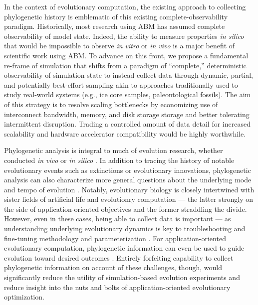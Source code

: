 In the context of evolutionary computation, the existing approach to collecting phylogenetic history is emblematic of this existing complete-observability paradigm.
Historically, most research using ABM has assumed complete observability of model state.
Indeed, the ability to measure properties \textit{in silico} that would be impossible to observe \textit{in vitro} or \textit{in vivo} is a major benefit of scientific work using ABM.
To advance on this front, we propose a fundamental re-frame of simulation that shifts from a paradigm of ``complete,'' deterministic observability of simulation state to instead collect data through dynamic, partial, and potentially best-effort sampling akin to approaches traditionally used to study real-world systems (e.g., ice core samples, paleontological fossils).
The aim of this strategy is to resolve scaling bottlenecks by economizing use of interconnect bandwidth, memory, and disk storage storage and better tolerating intermittent disruption.
Trading a controlled amount of data detail for increased scalability and hardware accelerator compatibility would be highly worthwhile.

Phylogenetic analysis is integral to much of evolution research, whether conducted \textit{in vivo} or \textit{in silico} \citep{faithConservationEvaluationPhylogenetic1992, STAMATAKIS2005phylogenetics,frenchHostPhylogenyShapes2023,kim2006discovery,lewinsohnStatedependentEvolutionaryModels2023a,lenski2003evolutionary}.
In addition to tracing the history of notable evolutionary events such as extinctions or evolutionary innovations, phylogenetic analysis can also characterize more general questions about the underlying mode and tempo of evolution \citep{moreno2023toward,hernandez2022can,shahbandegan2022untangling,lewinsohnStatedependentEvolutionaryModels2023a}.
Notably, evolutionary biology is closely intertwined with sister fields of artificial life and evolutionry computation --- the latter strongly on the side of application-oriented objectives and the former straddling the divide.
However, even in these cases, being able to collect data is important --- as understanding underlying evolutionary dynamics is key to troubleshooting and fine-tuning methodology and parameterization \citep{TODO}.
For application-oriented evolutionary computation, phylogenetic information can even be used to guide evolution toward desired outcomes \citep{lalejini2024phylogeny,lalejini2024runtime,murphy2008simple,burke2003increased}.
Entirely forfeiting capability to collect phylogenetic information on account of these challenges, though, would significantly reduce the utility of simulation-based evolution experiments and reduce insight into the nuts and bolts of application-oriented evolutionary optimization.

